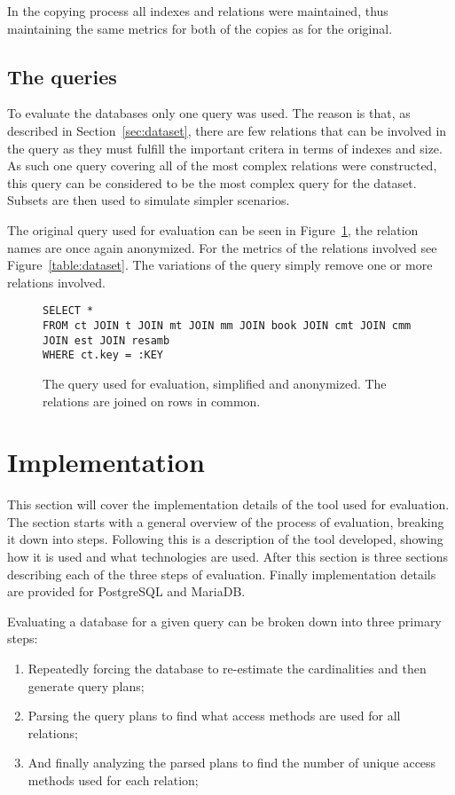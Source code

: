 In the copying process all indexes and relations were maintained, thus
maintaining the same metrics for both of the copies as for the original.

\subsection{The queries}\label{sec:queries}
To evaluate the databases only one query was used. The reason is that, as
described in Section~\ref{sec:dataset}, there are few relations that can be
involved in the query as they must fulfill the important critera in terms of
indexes and size. As such one query covering all of the most complex relations were
constructed, this query can be considered to be the most complex query for the
dataset. Subsets are then used to simulate simpler scenarios.

The original query used for evaluation can be seen in
Figure~\ref{fig:sql:query1}, the relation names are once again anonymized. For the
metrics of the relations involved see Figure~\ref{table:dataset}. The variations of
the query simply remove one or more relations involved.

\begin{figure}[ht]
\begin{verbatim}
SELECT *
FROM ct JOIN t JOIN mt JOIN mm JOIN book JOIN cmt JOIN cmm JOIN est JOIN resamb
WHERE ct.key = :KEY
\end{verbatim}
  \caption[ The original query used for evaluation ]{The query used for
    evaluation, simplified and anonymized. The relations are joined on rows in
    common.}\label{fig:sql:query1}
\end{figure}

\section{Implementation}\label{sec:implementation}
This section will cover the implementation details of the tool used for
evaluation. The section starts with a general overview of the process of
evaluation, breaking it down into steps. Following this is a description of the
tool developed, showing how it is used and what technologies are used. After
this section is three sections describing each of the three steps of evaluation.
Finally implementation details are provided for PostgreSQL and MariaDB.\@

Evaluating a database for a given query can be broken down into three primary
steps:
\begin{enumerate}
\item Repeatedly forcing the database to re-estimate the cardinalities and then
  generate query plans;
\item Parsing the query plans to find what access methods are used for all
  relations;
\item And finally analyzing the parsed plans to find the number of unique access
  methods used for each relation;
\end{enumerate}

